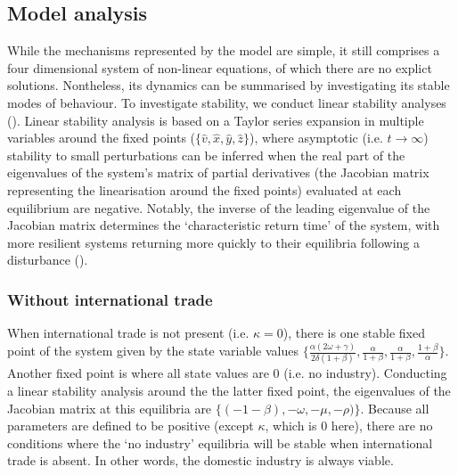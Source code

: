 \documentclass[12pt]{article}
\begin{document}
\subsection{Model analysis}
While the mechanisms represented by the model are simple, it still comprises a four dimensional system of non-linear equations, of which there are no explict solutions. Nontheless, its dynamics can be summarised by investigating its stable modes of behaviour. To investigate stability, we conduct linear stability analyses (\cite{strogatz1994}). Linear stability analysis is based on a Taylor series expansion in multiple variables around the fixed points ($\{\hat{v}, \hat{x}, \hat{y}, \hat{z}\}$), where asymptotic (i.e. $t \rightarrow \infty$) stability to small perturbations can be inferred when the real part of the eigenvalues of the system's matrix of partial derivatives (the Jacobian matrix representing the linearisation around the fixed points) evaluated at each equilibrium are negative. Notably, the inverse of the leading eigenvalue of the Jacobian matrix determines the `characteristic return time' of the system, with more resilient systems returning more quickly to their equilibria following a disturbance (\cite{pimm1984}).

\subsubsection{Without international trade}
When international trade is not present (i.e. $\kappa = 0$), there is one stable fixed point of the system given by the state variable values $\big \{\frac{\alpha(2\omega + \gamma)}{2 \delta (1 + \beta)}, \frac{\alpha}{1 + \beta}, \frac{\alpha}{1 + \beta}, \frac{1 + \beta}{\alpha}\big\}$. Another fixed point is where all state values are 0 (i.e. no industry). Conducting a linear stability analysis around the the latter fixed point, the eigenvalues of the Jacobian matrix at this equilibria are $\{(-1 - \beta), - \omega, - \mu, - \rho)\}$.
Because all parameters are defined to be positive (except $\kappa$, which is $0$ here), there are no conditions where the `no industry' equilibria will be stable when international trade is absent. In other words, the domestic industry is always viable.

\iffalse
The Jacbobian matrix ($\boldsymbol{J}$) at this equilibria evalutes to:

\begin{equation}
  \boldsymbol{J} \Big |_{\{\frac{\alpha(2\omega + \gamma)}{2 \delta (1 + \beta)}, \frac{\alpha}{1 + \beta}, \frac{\alpha}{1 + \beta}, \frac{1 + \beta}{\alpha}\}} =
  \begin{pmatrix}
    0   &    0     &  0 &  \frac{\alpha^2(2 \omega + \gamma)}{2 \delta (1 + \beta)} \\
    \delta & - \omega - \frac{\gamma}{4}  &  - \frac{\gamma}{4} & 0 \\
    0      &           0            & -\mu     & - \mu (\frac{\alpha}{1+\beta})^2\\
    0      &   - \rho (\frac{1 + \beta}{\alpha})^2    & \rho (\frac{1+\beta}{\alpha})^2 & 0 \\
  \end{pmatrix}
\end{equation}
\fi
\end{document}
